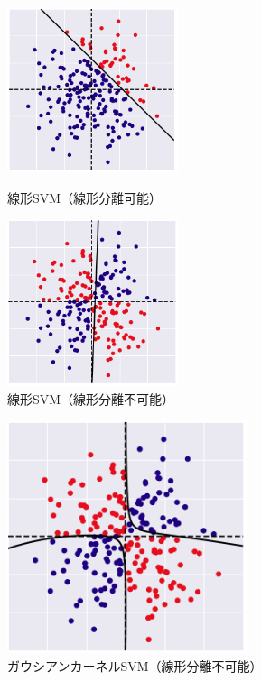 \begin{figure}[t]
    \begin{minipage}{0.5\hsize}
     \begin{center}
      \includegraphics[width=50mm]{images/linearSVM.png}
     \end{center}
     \caption{線形SVM（線形分離可能）}
     \label{fig:linear}
    \end{minipage}
    \begin{minipage}{0.5\hsize}
     \begin{center}
      \includegraphics[width=50mm]{images/xorlinearSVM.png}
     \end{center}
     \caption{線形SVM（線形分離不可能）}
     \label{fig:xor}
    \end{minipage}
\end{figure}
\begin{figure}[t]
    \centering
    \includegraphics[width=70mm]{images/xorkernelSVM.png}
    \caption{ガウシアンカーネルSVM（線形分離不可能）}
    \label{fig:kernel}
\end{figure}

